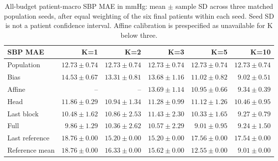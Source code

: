 \documentclass[11pt]{article}
\begin{document}
\begin{table}[!htbp]\centering\small
\begin{tabular}{lrrrrr}\toprule
SBP MAE & K=1 & K=2 & K=3 & K=5 & K=10\\\midrule
Population & $12.73\pm0.74$ & $12.73\pm0.74$ & $12.73\pm0.74$ & $12.73\pm0.74$ & $12.73\pm0.74$\\
Bias & $14.53\pm0.67$ & $13.31\pm0.81$ & $13.68\pm1.16$ & $11.02\pm0.82$ & $9.02\pm0.51$\\
Affine & -- & -- & $13.69\pm1.14$ & $10.95\pm0.66$ & $9.34\pm0.39$\\
Head & $11.86\pm0.29$ & $10.94\pm1.34$ & $11.28\pm0.99$ & $11.12\pm1.26$ & $10.46\pm0.95$\\
Last block & $10.48\pm1.62$ & $10.86\pm2.53$ & $11.43\pm2.30$ & $10.33\pm1.65$ & $9.27\pm0.79$\\
Full & $9.86\pm1.29$ & $10.36\pm2.62$ & $10.57\pm2.29$ & $9.01\pm0.95$ & $9.24\pm1.50$\\
Last reference & $18.76\pm0.00$ & $15.20\pm0.00$ & $15.20\pm0.00$ & $17.56\pm0.00$ & $17.54\pm0.00$\\
Reference mean & $18.76\pm0.00$ & $16.33\pm0.00$ & $15.62\pm0.00$ & $12.55\pm0.00$ & $9.01\pm0.00$\\
\bottomrule\end{tabular}
\caption{All-budget patient-macro SBP MAE in mmHg: mean $\pm$ sample SD across three matched population seeds, after equal weighting of the six final patients within each seed. Seed SD is not a patient confidence interval. Affine calibration is prespecified as unavailable for K below three.}\end{table}
\end{document}

